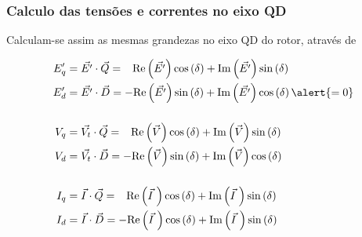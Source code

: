 \documentclass[10pt, compress,xcolor={svgnames,dvipsnames,x11names}]{beamer}
\begin{document}
\begin{frame}%
\frametitle{Calculo das tensões e correntes no eixo QD}
\scriptsize

	Calculam-se assim as mesmas grandezas no eixo QD do rotor, através de

\begin{align}
	E'_q &= \vec{E'} \cdot \vec{Q} = \phantom{-}\text{Re}\left(\vec{E'}\right)\cos\left(\delta\right) + \text{Im}\left(\vec{E'}\right)\sin\left(\delta\right) \label{eq::QDinicio}\\
	E'_d &= \vec{E'} \cdot \vec{D} = -\text{Re}\left(\vec{E'}\right)\sin\left(\delta\right) + \text{Im}\left(\vec{E'}\right)\cos\left(\delta\right)\alert{=0}  \\[5mm]
%
	V_q &= \vec{V_t} \cdot \vec{Q} = \phantom{-}\text{Re}\left(\vec{V}\right)\cos\left(\delta\right) + \text{Im}\left(\vec{V}\right)\sin\left(\delta\right) \\
	V_d &= \vec{V_t} \cdot \vec{D} = -\text{Re}\left(\vec{V}\right)\sin\left(\delta\right) + \text{Im}\left(\vec{V}\right)\cos\left(\delta\right)  \\[5mm]
%
	I_q &= \vec{I} \cdot \vec{Q} = \phantom{-}\text{Re}\left(\vec{I}\hspace{1mm}\right)\cos\left(\delta\right) + \text{Im}\left(\vec{I}\hspace{1mm}\right)\sin\left(\delta\right)  \\
	I_d &= \vec{I} \cdot \vec{D} = - \text{Re}\left(\vec{I}\hspace{1mm}\right)\cos\left(\delta\right) + \text{Im}\left(\vec{I}\hspace{1mm}\right)\sin\left(\delta\right) \label{eq::QDfinal}
\end{align}
\normalsize
\end{frame}%
\end{document}
